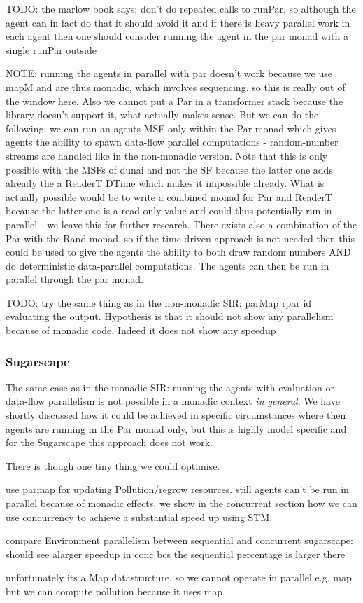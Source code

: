TODO: the marlow book says: don't do repeated calls to runPar, so although the agent can in fact do that it should avoid it and if there is heavy parallel work in each agent then one should consider running the agent in the par monad with a single runPar outside

NOTE: running the agents in parallel with par doesn't work because we use mapM and are thus monadic, which involves sequencing. so this is really out of the window here. Also we cannot put a Par in a transformer stack because the library doesn't support it, what actually makes sense. But we can do the following: we can run an agents MSF only within the Par monad which gives agents the ability to spawn data-flow parallel computations - random-number streams are handled like in the non-monadic version. Note that this is only possible with the MSFs of dunai and not the SF because the latter one adds already the a ReaderT DTime which makes it impossible already. 
What is actually possible would be to write a combined monad for Par and ReaderT because the latter one is a read-only value and could thus potentially run in parallel - we leave this for further research. There exists also a combination of the Par with the Rand monad, so if the time-driven approach is not needed then this could be used to give the agents the ability to both draw random numbers AND do deterministic data-parallel computations. The agents can then be run in parallel through the par monad.

TODO: try the same thing as in the non-monadic SIR: parMap rpar id evaluating the output. Hypothesis is that it should not show any parallelism because of monadic code. Indeed it does not show any speedup

\subsubsection{Sugarscape}
The same case as in the monadic SIR: running the agents with evaluation or data-flow parallelism is not possible in a monadic context  \textit{in general}. We have shortly discussed how it could be achieved in specific circumstances where then agents are running in the Par monad only, but this is highly model specific and for the Sugarscape this approach does not work. 

There is though one tiny thing we could optimise.

use parmap for updating Pollution/regrow resources. still agents can't be run in parallel because of monadic effects, we show in the concurrent section how we can use concurrency to achieve a substantial speed up using STM.

compare Environment parallelism between sequential and concurrent sugarscape: should see alarger speedup in conc bcs the sequential percentage is larger there

unfortunately its a Map datastructure, so we cannot operate in parallel e.g. map. but we can compute pollution because it uses map



